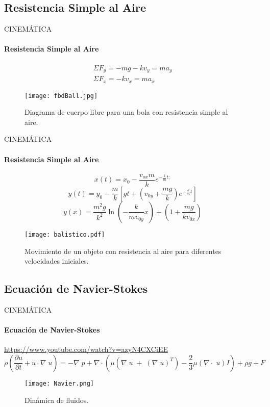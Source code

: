 \subsection{Resistencia Simple al Aire}
\begin{frame}{CINEMÁTICA}
\framesubtitle{Resistencia Simple al Aire}
	\begin{equation}
    \begin{gathered}
	\Sigma F_y = -mg -kv_{y} = ma_y\\
    \Sigma F_x = -kv_{x} = ma_x
    \end{gathered}
	\end{equation}
	\begin{figure}[H]
  		\centering
  		\texttt{[image: fbdBall.jpg]}
 		\caption{Diagrama de cuerpo libre para una bola con resistencia simple al aire.}
	\end{figure}
\end{frame}
\begin{frame}{CINEMÁTICA}
\framesubtitle{Resistencia Simple al Aire}
\begin{equation}
x\left( t \right)=x_{0}-\frac{v_{ox}m}{k}e^{-\frac{k}{m}t;}
\end{equation}
\begin{equation}
	y\left( t \right)=y_{0}-\frac{m}{k}\left[ gt+\left( v_{0y}+\frac{mg}{k} \right)e^{-\frac{k}{m}t} \right]
\end{equation}
\begin{equation}
	y\left( x \right)=\frac{m^{2}g}{k^{2}}\ln \left( -\frac{k}{mv_{0y}}x \right)+\left( 1+\frac{mg}{kv_{0x}} \right)
\end{equation}
	\begin{figure}[H]
  		\centering
  		\texttt{[image: balistico.pdf]}
 		\caption{Movimiento de un objeto con resistencia al aire para diferentes velocidades iniciales\footnotemark{}.}
	\end{figure}
    \vspace{-1cm}
\end{frame}

\subsection{Ecuación de Navier-Stokes}
\begin{frame}{CINEMÁTICA}
\framesubtitle{Ecuación de Navier-Stokes}
\url{https://www.youtube.com/watch?v=azyN4CXCiEE}
\begin{equation}
\rho \left( \frac{\partial u}{\partial t}+u\cdot\nabla\; u \right)=-\nabla\; p+\nabla\cdot\left( \mu \left( \nabla\; u\; +\; \left( \nabla\; u \right)^{T} \right)-\frac{2}{3}\mu \left( \nabla\cdot\; u \right)I \right)+\rho g+F
\end{equation}
	\begin{figure}[H]
  		\centering
  		\texttt{[image: Navier.png]}
 		\caption{Dinámica de fluidos.}
	\end{figure}
\end{frame}
